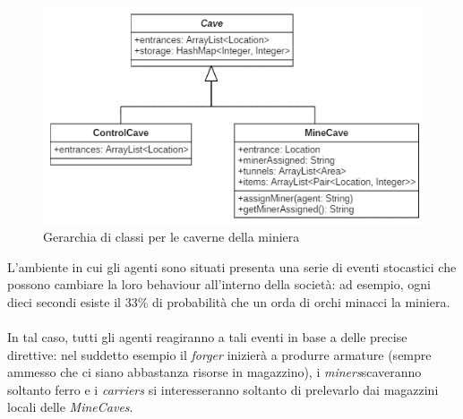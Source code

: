 \documentclass{llncs}
\begin{document}
\begin{figure}
  \centering
   \includegraphics[scale = 0.7]{img/diagramCaves.png}
  \caption{Gerarchia di classi per le caverne della miniera}
\end{figure}


\vspace{21cm}

L'ambiente in cui gli agenti sono situati presenta una serie di eventi stocastici che possono cambiare la loro behaviour all'interno della società: ad esempio, ogni dieci secondi esiste il 33\% di probabilità che un orda di orchi minacci la miniera.\\\\
In tal caso, tutti gli agenti reagiranno a tali eventi in base a delle precise direttive: nel suddetto esempio il \textit{forger} inizierà a produrre armature (sempre ammesso che ci siano abbastanza risorse in magazzino), i \textit{miners}scaveranno soltanto ferro e i \textit{carriers} si interesseranno soltanto di prelevarlo dai magazzini locali delle \textit{MineCaves}.
\newpage
\end{document}
